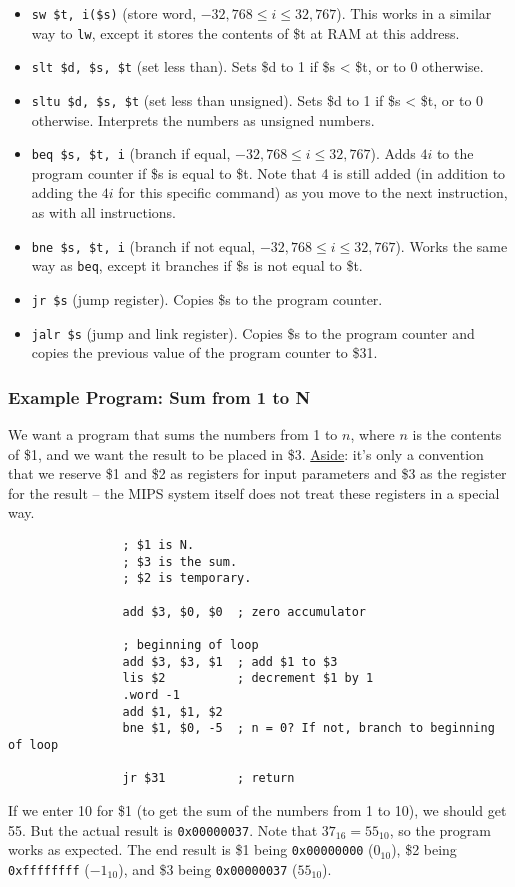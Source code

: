 \documentclass[]{article}
\theoremstyle{definition}
\begin{document}
\begin{itemize}
				\item \verb+sw $t, i($s)+ (store word, $-32,768 \le i \le 32,767$). This works in a similar way to \verb+lw+, except it stores the contents of \$t at RAM at this address.
				\item \verb+slt $d, $s, $t+ (set less than). Sets \$d to 1 if \$s < \$t, or to 0 otherwise.
				\item \verb+sltu $d, $s, $t+ (set less than unsigned). Sets \$d to 1 if \$s < \$t, or to 0 otherwise. Interprets the numbers as unsigned numbers.
				\item \verb+beq $s, $t, i+ (branch if equal, $-32,768 \le i \le 32,767$). Adds $4i$ to the program counter if \$s is equal to \$t. Note that 4 is still added (in addition to adding the $4i$ for this specific command) as you move to the next instruction, as with all instructions. 
				\item \verb+bne $s, $t, i+ (branch if not equal, $-32,768 \le i \le 32,767$). Works the same way as \verb+beq+, except it branches if \$s is not equal to \$t.
				\item \verb+jr $s+ (jump register). Copies \$s to the program counter.
				\item \verb+jalr $s+ (jump and link register). Copies \$s to the program counter and copies the previous value of the program counter to \$31.
			\end{itemize}
		\subsubsection{Example Program: Sum from 1 to N}
			We want a program that sums the numbers from 1 to $n$, where $n$ is the contents of \$1, and we want the result to be placed in \$3. \underline{Aside}: it's only a convention that we reserve \$1 and \$2 as registers for input parameters and \$3 as the register for the result -- the MIPS system itself does not treat these registers in a special way.
			\begin{verbatim}
				; $1 is N.
				; $3 is the sum.
				; $2 is temporary.

				add $3, $0, $0  ; zero accumulator

				; beginning of loop
				add $3, $3, $1  ; add $1 to $3
				lis $2          ; decrement $1 by 1
				.word -1
				add $1, $1, $2
				bne $1, $0, -5  ; n = 0? If not, branch to beginning of loop

				jr $31          ; return
			\end{verbatim}
			If we enter 10 for \$1 (to get the sum of the numbers from 1 to 10), we should get 55. But the actual result is \verb+0x00000037+. Note that $37_{16} = 55_{10}$, so the program works as expected. The end result is \$1 being \verb+0x00000000+ ($0_{10}$), \$2 being \verb+0xffffffff+ ($-1_{10}$), and \$3 being \verb+0x00000037+ ($55_{10}$).
\end{document}
